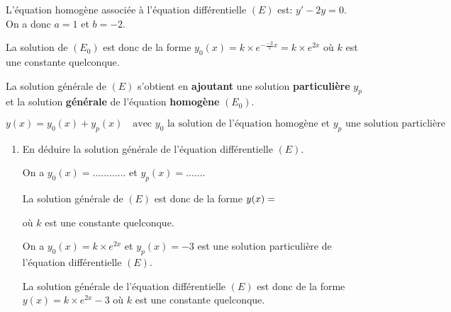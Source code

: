 \begin{exemple}{}
\begin{enumerate}[series=A, resume]
\begin{blocvisiblex}[height=2]
{	}
L'équation homogène associée à l'équation différentielle $(E)$ est: $y'-2y=0$. On a donc $a=1$ et $b=-2$.

\medskip

La solution de $(E_0)$ est donc de la forme $y_0(x)=k \times e^{-\frac{-2}{1}x}=k \times e^{2x}$ où $k$ est une constante quelconque.


	
\end{blocvisiblex}
	

	\end{enumerate}

\medskip

\begin{propriete}[Ensemble des solutions d'une équation différentielle $(E):\; ay'+by=d(x)$]{}
La solution générale de $(E)$ s'obtient en \textbf{ajoutant} une solution \textbf{particulière} $y_p$ et la solution \textbf{générale} de l'équation \textbf{homogène} $(E_0)$.

\[y(x)=y_0(x)+y_p(x) \quad \text{avec $y_0$ la solution de l'équation homogène et $y_p$ une solution particlière}\]
\end{propriete}
	\begin{enumerate}[series=A, resume]
		
		
		\item En déduire la solution générale de l'équation différentielle $(E)$.


\begin{blocvisiblex}[height=2]
    {
On a $y_0(x)=\ldots{}\ldots{}\ldots{}\ldots{}$ et $y_p(x)=\ldots{}\ldots{}$.

\medskip

La solution générale de $(E)$ est donc de la forme $y(x)=\dotfill$ 

où $k$ est une constante quelconque.

	}
On a $y_0(x)=k \times e^{2x}$ et $y_p(x)=-3$ est une solution particulière de l'équation différentielle $(E)$.

\par

La solution générale de l'équation différentielle $(E)$ est donc de la forme $y(x)=k \times e^{2x}-3$ où $k$ est une constante quelconque.

	
\end{blocvisiblex}

	\end{enumerate}

	\medskip

	\begin{propriete}{}


\end{propriete}
\end{exemple}

